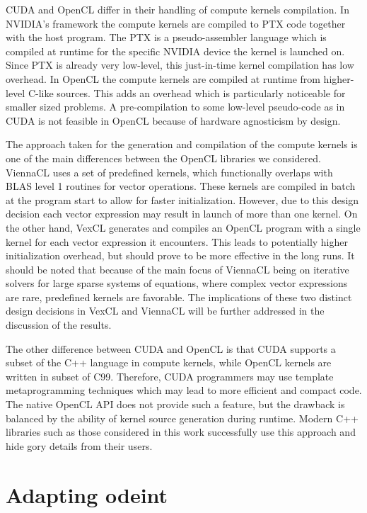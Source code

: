 \documentclass[final]{siamltex}
\begin{document}
CUDA and OpenCL differ in their handling of compute kernels compilation. In
NVIDIA's framework the compute kernels are compiled to PTX code together with
the host program. The PTX is a pseudo-assembler language which is compiled at
runtime for the specific NVIDIA device the kernel is launched on. Since PTX is already
very low-level, this just-in-time kernel compilation has low overhead. In
OpenCL the compute kernels are compiled at runtime from higher-level C-like sources.
This adds an overhead which is particularly noticeable for smaller sized
problems. A pre-compilation to some low-level pseudo-code as in CUDA is not feasible in
OpenCL because of hardware agnosticism by design.

The approach taken for the generation and compilation of the compute kernels is one of the
main differences between the OpenCL libraries we considered. 
ViennaCL uses a set of predefined kernels, which functionally overlaps with BLAS level
1 routines for vector operations. 
These kernels are compiled in batch at the program start to allow
for faster initialization. However, due to this design decision each vector
expression may result in launch of more than one kernel.  On the other hand,
VexCL generates and compiles an OpenCL program with a single kernel for each
vector expression it encounters.  This leads to potentially higher
initialization overhead, but should prove to be more effective in the long
runs. It should be noted that because of the main focus of ViennaCL being on iterative
solvers for large sparse systems of equations, where complex vector
expressions are rare, predefined kernels are favorable.
The implications of these two distinct design decisions in VexCL and ViennaCL will be further addressed in the discussion of the results.

The other difference between CUDA and OpenCL is that CUDA supports a subset of the
C++ language in compute kernels, while OpenCL kernels are written in subset of
C99. Therefore, CUDA programmers may use template metaprogramming techniques
which may lead to more efficient and compact code. The native OpenCL API does not
provide such a feature, but the drawback is balanced by the ability of
kernel source generation during runtime. Modern C++ libraries such as those considered in
this work successfully use this approach and hide gory details from their
users.




%
%
\section{Adapting odeint}
\end{document}

